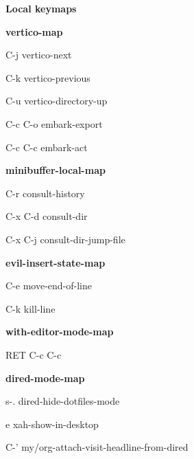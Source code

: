 \documentclass[10pt]{article}
\renewcommand\section[1]{\bigskip\par\textbf{\color{heading}\large#1}\smallskip}
\renewcommand\subsection[1]{\smallskip\par\textbf{\color{heading}#1}}
\begin{document}
\begin{multicols}{4}
  \section{Local keymaps}
  \subsection{vertico-map}
  \begin{keylist}
    \item[C-j] vertico-next
    \item[C-k] vertico-previous
    \item[C-u] vertico-directory-up
    \item[C-c C-o] embark-export
    \item[C-c C-c] embark-act
  \end{keylist}
  \subsection{minibuffer-local-map}
  \begin{keylist}
    \item[C-r] consult-history
    \item[C-x C-d] consult-dir
    \item[C-x C-j] consult-dir-jump-file
  \end{keylist}
  \subsection{evil-insert-state-map}
  \begin{keylist}
    \item[C-e] move-end-of-line
    \item[C-k] kill-line
  \end{keylist}
  \subsection{with-editor-mode-map}
  \begin{keylist}
    \item[RET] C-c C-c
  \end{keylist}

  \subsection{dired-mode-map}
  \begin{keylist}
    \item[s-.] dired-hide-dotfiles-mode
    \item[e] xah-show-in-desktop
    \item[C-'] my/org-attach-visit-headline-from-dired
  \end{keylist}



\end{multicols}
\end{document}
